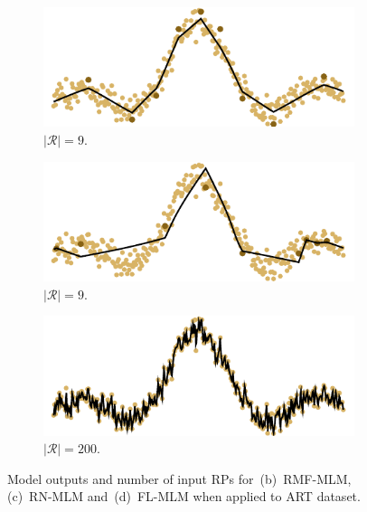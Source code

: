 \documentclass[final]{beamer}
\begin{document}
\begin{frame}[t]
\begin{multicols}{3}
\begin{figure}
   \begin{subfigure}[b]{0.28\textwidth}
      \includegraphics[width=\textwidth]{rmf_mlm.pdf}
      \caption{$|\mathcal{R}|=9$.}\label{fig:results-art_1-dataset}
  \end{subfigure}
  \begin{subfigure}[b]{0.28\textwidth}
      \includegraphics[width=\textwidth]{rn_mlm.pdf}\vspace{-0.1em}
      \caption{$|\mathcal{R}|=9$.}\label{fig:results-art_1-fl}
  \end{subfigure}
  \begin{subfigure}[b]{0.28\textwidth}
      \includegraphics[width=\textwidth]{fl_mlm.pdf}\vspace{-0.1em}
      \caption{$|\mathcal{R}|=200$.}\label{fig:results-art_1-fl}
  \end{subfigure}
    \caption{Model outputs and number of input RPs for~(b)~RMF-MLM, (c)~RN-MLM and~(d)~FL-MLM when applied to ART dataset.}\label{}
\end{figure}




\end{multicols}
\end{frame}
\end{document}
